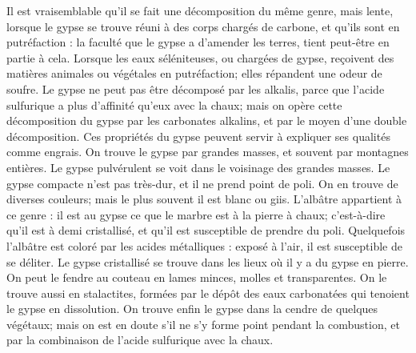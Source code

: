 Il est vraisemblable qu'il se fait une décomposition du même genre, mais lente, lorsque le gypse se trouve réuni à des corps chargés de carbone, et qu'ils sont en putréfaction : la faculté que le gypse a d'amender les terres, tient peut-être en partie à cela. Lorsque les eaux séléniteuses, ou chargées de gypse, reçoivent des matières animales ou végétales en putréfaction; elles répandent une odeur de soufre.\setcounter{page}{44} Le gypse ne peut pas être décomposé par les alkalis, parce que l'acide sulfurique a plus d'affinité qu'eux avec la chaux; mais on opère cette décomposition du gypse par les carbonates alkalins, et par le moyen d'une double décomposition. Ces propriétés du gypse peuvent servir à expliquer ses qualités comme engrais.
On trouve le gypse par grandes masses, et souvent par montagnes entières. Le gypse pulvérulent se voit dans le voisinage des grandes masses. Le gypse compacte n'est pas très-dur, et il ne prend point de poli. On en trouve de diverses couleurs; mais le plus souvent il est blanc ou giis. L'albâtre appartient à ce genre : il est au gypse ce que le marbre est à la pierre à chaux; c'est-à-dire qu'il est à demi cristallisé, et qu'il est susceptible de prendre du poli. Quelquefois l'albâtre est coloré par les acides métalliques : exposé à l'air, il est susceptible de se déliter.
Le gypse cristallisé se trouve dans les lieux où il y a du gypse en pierre. On peut le fendre au couteau en lames minces, molles et transparentes.
On le trouve aussi en stalactites, formées par le dépôt des eaux carbonatées qui tenoient le gypse en dissolution. On trouve enfin le gypse dans la cendre de quelques végétaux;\setcounter{page}{45} mais on est en doute s'il ne s'y forme point pendant la combustion, et par la combinaison de l'acide sulfurique avec la chaux.
